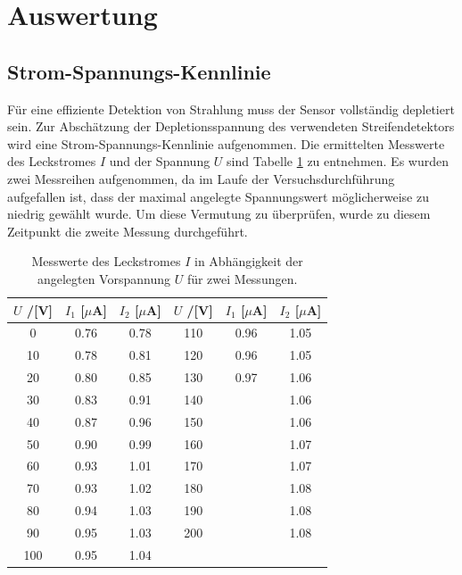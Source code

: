 \section{Auswertung}

\subsection{Strom-Spannungs-Kennlinie}
\label{kap:Kennlinie}
Für eine effiziente Detektion von Strahlung muss der Sensor vollständig depletiert sein. Zur Abschätzung der Depletionsspannung des verwendeten Streifendetektors wird eine Strom-Spannungs-Kennlinie aufgenommen. Die ermittelten Messwerte des Leckstromes $I$ und der Spannung $U$ sind Tabelle \ref{tab:UI-Kennlinie} zu entnehmen. Es wurden zwei Messreihen aufgenommen, da im Laufe der Versuchsdurchführung aufgefallen ist, dass der maximal angelegte Spannungswert möglicherweise zu niedrig gewählt wurde. Um diese Vermutung zu überprüfen, wurde zu diesem Zeitpunkt die zweite Messung durchgeführt.

\begin{table}[ht]
  \centering
  \caption{Messwerte des Leckstromes $I$ in Abhängigkeit der angelegten Vorspannung $U$ für zwei Messungen.}
  \label{tab:UI-Kennlinie}
  \begin{tabular} { c c c | c c c}
  \toprule
  {$U$ /[V]} & {$I_1$ [$\mu$A]} & {$I_2$ [$\mu$A]} & {$U$ /[V]} & {$I_1$ [$\mu$A]} & {$I_2$ [$\mu$A]}\\
  \midrule
     0 & 0.76 & 0.78 & 110& 0.96 & 1.05 \\
    10 & 0.78 & 0.81 &  120& 0.96 & 1.05\\
    20 & 0.80 & 0.85 &  130& 0.97 & 1.06\\
    30 & 0.83 & 0.91 &  140& & 1.06 \\
    40 & 0.87 & 0.96 &  150& & 1.06 \\
    50 & 0.90 & 0.99 &  160& & 1.07 \\
    60 & 0.93 & 1.01 &  170& & 1.07 \\
    70 & 0.93 & 1.02 &  180& & 1.08 \\
    80 & 0.94 & 1.03 &  190& & 1.08 \\
    90 & 0.95 & 1.03 &  200& & 1.08 \\
    100& 0.95 & 1.04 \\
  \bottomrule
  \end{tabular}
  \end{table}
  \FloatBarrier

